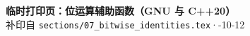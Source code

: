 \documentclass{article}
\begin{document}
	\begin{center}
		{\Large \textbf{临时打印页：位运算辅助函数（GNU 与 C++20）}} \\[4pt]
		{\small 补印自 \texttt{sections/07\_bitwise\_identities.tex}\quad·-10-12}
	\end{center}

	\vspace{0.5em}

	
\end{document}
